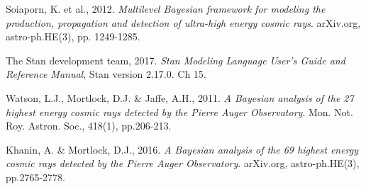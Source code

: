 \documentclass[fontsize=12pt]{article}
\begin{document}
\begin{thebibliography}{9}

Soiaporn, K. et al., 2012. \emph{Multilevel Bayesian framework for modeling the production, propagation and detection of ultra-high energy cosmic rays}. arXiv.org, astro-ph.HE(3), pp. 1249-1285.

The Stan development team, 2017. \emph{Stan Modeling Language User's Guide and Reference Manual}, Stan version 2.17.0. Ch 15.

Watson, L.J., Mortlock, D.J. \& Jaffe, A.H., 2011. \emph{A Bayesian analysis of the 27 highest energy cosmic rays detected by the Pierre Auger Observatory}. Mon. Not. Roy. Astron. Soc., 418(1), pp.206-213.

Khanin, A. \& Mortlock, D.J., 2016. \emph{A Bayesian analysis of the 69 highest energy cosmic rays detected by the Pierre Auger Observatory}. arXiv.org, astro-ph.HE(3), pp.2765-2778.

\end{thebibliography}
\end{document}
